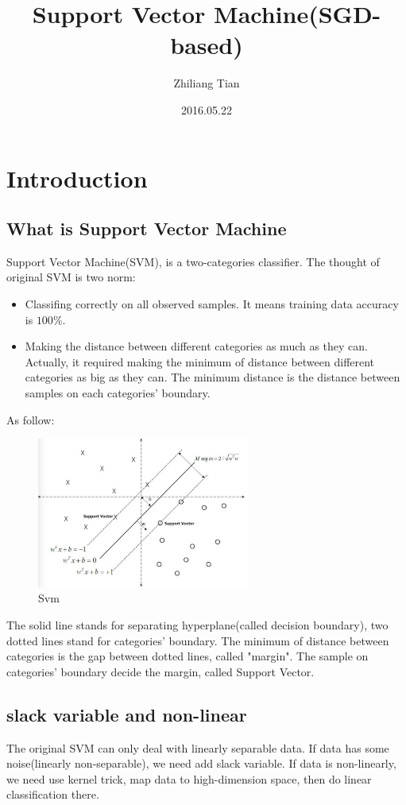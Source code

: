 \documentclass[11pt]{article}
\begin{document}
\title{Support Vector Machine(SGD-based)}
\author{Zhiliang Tian}
\date{2016.05.22}
\maketitle
\section{Introduction}
\subsection{What is Support Vector Machine}
Support Vector Machine(SVM), is a two-categories classifier. The thought of original SVM is two norm:
\begin{itemize}
\item Classifing correctly on all observed samples. It means training data accuracy is $100\%$. 
\item Making the distance between different categories as much as they can. Actually, it required making the minimum of distance between different categories as big as they can. The minimum distance is the distance between samples on each categories' boundary.
\end{itemize}
As follow:
\begin{figure}[h!]
    \centering
    \includegraphics[width=7cm]{f1.png}
    \caption{Svm}
    \label{fig-sample}
\end{figure}

The solid line stands for separating hyperplane(called decision boundary), two dotted lines stand for categories' boundary. The minimum of distance between categories is the gap between dotted lines, called "margin". The sample on categories' boundary decide the margin, called Support Vector. 

\subsection{slack variable and non-linear}
The original SVM can only deal with linearly separable data. If data has some noise(linearly non-separable), we need add slack variable. If data is non-linearly, we need use kernel trick, map data to high-dimension space, then do linear classification there.
\end{document}
